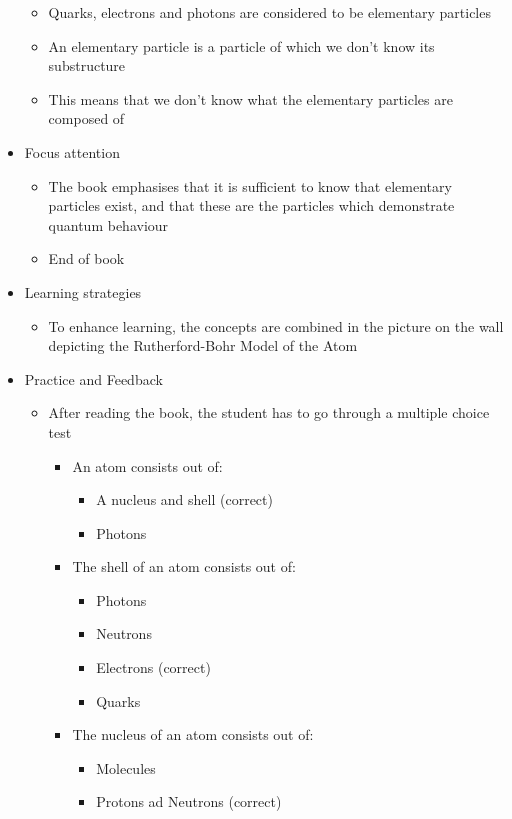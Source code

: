 \documentclass[11pt,twoside]{report} %
\begin{document}
\begin{itemize}
\begin{itemize}
			\item Quarks, electrons and photons are considered to be elementary particles
			\item An elementary particle is a particle of which we don’t know its substructure
			\item This means that we don’t know what the elementary particles are composed of
		\end{itemize}
		\item Focus attention
		\begin{itemize}
			\item The book emphasises that it is sufficient to know that elementary particles exist, and that these are the particles which demonstrate quantum behaviour
			\item {End of book}
		\end{itemize}
		\item Learning strategies
		\begin{itemize}
			\item To enhance learning, the concepts are combined in the picture on the wall depicting the Rutherford-Bohr Model of the Atom
		\end{itemize}
		\item Practice and Feedback
		\begin{itemize}
			\item After reading the book, the student has to go through a multiple choice test
			\begin{itemize}
				\item An atom consists out of:
				\begin{itemize}
					\item A nucleus and shell (correct)
					\item Photons
				\end{itemize}
				\item The shell of an atom consists out of:
				\begin{itemize}
					\item Photons
					\item Neutrons
					\item Electrons (correct)
					\item Quarks
				\end{itemize}
				\item The nucleus of an atom consists out of:
				\begin{itemize}
					\item Molecules
					\item Protons ad Neutrons (correct)

\end{itemize}
\end{itemize}
\end{itemize}
\end{itemize}
\end{document}
